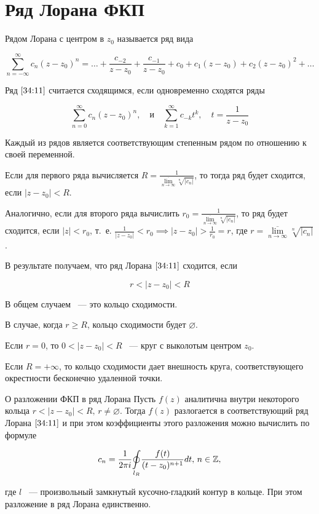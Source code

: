 \documentclass[../../main.tex]{subfiles}
\begin{document}
\section{Ряд Лорана ФКП}

Рядом Лорана с центром в $ z_0 $ называется ряд вида

\begin{equation}\label{34:11}
	\sum\limits_{n = -\infty}^{\infty}c_n(z - z_0)^n = \ldots + \frac{c_{-2}}{z - z_0} + \frac{c_{-1}}{z - z_0} + c_0 + c_1(z - z_0) + c_2(z - z_0)^2 + \ldots
\end{equation}

Ряд $ \eqref{34:11} $ считается сходящимся, если одновременно сходятся ряды 

\[ \sum\limits_{n = 0}^{\infty} c_n(z - z_0)^n, \quad \text{и} \quad \sum\limits_{k = 1}^{\infty} c_{-k}t^k, \quad t = \frac{1}{z - z_0} \]

Каждый из рядов является соответствующим степенным рядом по отношению к своей переменной.

Если для первого ряда вычисляется $ R = \frac{1}{\overline{\underset{n \to \infty}{\lim}} \sqrt[n]{|c_n|}} $, то тогда ряд будет сходится, если $ |z - z_0| < R $.

Аналогично, если для второго ряда вычислить $ r_0 = \frac{1}{\overline{\underset{n \to \infty}{\lim}} \sqrt[n]{|c_n|}} $, то ряд будет сходится, если $ |z| < r_0 $, т.~е. $ \frac{1}{|z - z_0|} < r_0 \implies |z - z_0| > \frac{1}{r_0} = r $, где $ r = \overline{\underset{n \to \infty}{\lim}} \sqrt[n]{|c_n|} $.

В результате получаем, что ряд Лорана $ \eqref{34:11} $ сходится, если

\[ r < |z - z_0| < R \]

В общем случаем ~--- это кольцо сходимости.

В случае, когда $ r \geq R $, кольцо сходимости будет $ \varnothing $.

Если $r = 0$, то $ 0 < |z - z_0| < R $ ~--- круг с выколотым центром $z_0$.

Если $ R = +\infty $, то кольцо сходимости дает внешность круга, соответствующего окрестности бесконечно удаленной точки.

\begin{thm}{О разложении ФКП в ряд Лорана}
	Пусть $ f(z) $ аналитична внутри некоторого кольца $ r < |z - z_0| < R,\, r \neq \varnothing $. Тогда $ f(z) $ разлогается в соответствующий ряд Лорана $ \eqref{34:11} $ и при этом коэффициенты этого разложения можно вычислить по формуле
	
	\begin{equation}\label{34:12}
		c_n = \frac{1}{2 \pi i} \underset{l_R}\oint\frac{f(t)}{(t - z_0)^{n + 1}} dt,\, n \in \mathbb{Z},
	\end{equation}
	
	где $ l $ ~--- произвольный замкнутый кусочно-гладкий контур в кольце. При этом разложение в ряд Лорана единственно.
\end{thm}
\end{document}
